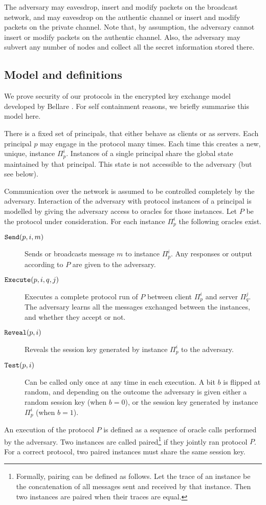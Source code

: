 \documentclass[runningheads,envcountsame,envcountsect,oribibl]{llncs}
\newcommand{\call}{a}
\begin{document}
The adversary may eavesdrop, insert and modify packets on the broadcast
network, and may eavesdrop on the authentic channel or insert and modify
packets on the private channel. Note that, by assumption, the adversary cannot
insert or modify packets on the authentic channel.
Also, the adversary may subvert any number of
nodes and collect all the secret information stored there.

\subsection{Model and definitions}

\renewcommand{\inst}[2]{\Pi_{#1}^{#2}}
\renewcommand{\call}[1]{\text{\texttt{#1}}}
\newcommand{\adverse}{{\cal{A}}}
\newcommand{\adv}{\text{\textsf{Adv}}}

We prove security of our protocols in the encrypted key exchange model
developed by Bellare \etal\cite{BelPR00}. For self containment reasons, we
briefly summarise this model here. 

There is a fixed set of principals, that either behave as clients or as
servers. Each principal $p$ may engage in the protocol many times.
Each time
this creates a new, unique, instance $\inst{p}{i}$. Instances of a single
principal share the global state maintained by that principal. This state is
not accessible to the adversary (but see below).

Communication over the network is assumed to be controlled completely by the
adversary. Interaction of the adversary with protocol instances of a principal
is modelled by giving the adversary access to oracles for those instances. 
Let $P$ be the protocol under consideration.
For each instance $\inst{p}{i}$ the following oracles exist.
\begin{description}
\item[$\call{Send}(p,i,m)$]
  Sends or broadcasts message $m$ to instance $\inst{p}{i}$. Any responses or
  output according to $P$ are given to the adversary.
\item[$\call{Execute}(p,i,q,j)$]
  Executes a complete protocol run of $P$ between client $\inst{p}{i}$ and
  server $\inst{q}{j}$. The adversary learns all the messages exchanged between
  the instances, and whether they accept or not.
\item[$\call{Reveal}(p,i)$]
  Reveals the session key generated by instance $\inst{p}{i}$ to the adversary.
\item[$\call{Test}(p,i)$]
  Can be called only once at any time in each execution. A bit $b$ is flipped
  at random, and depending on the outcome the adversary is given either a
  random session key (when $b=0$), or the session key generated by instance
  $\inst{p}{i}$ (when $b=1$).
\end{description}
An execution of the protocol $P$ is defined as a sequence of oracle calls
performed by the adversary. Two instances are called paired\footnote{
  Formally, pairing can be defined as follows. Let the trace of an instance be 
  the concatenation of all messages sent and received by that instance. Then
  two instances are paired when their traces are equal.
} 
if they jointly ran protocol $P$. For a correct protocol, two paired instances
must share the same session key. 
\end{document}
